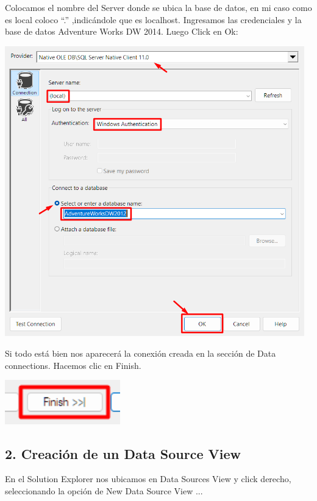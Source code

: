 \documentclass[12pt,letterpaper]{article}
\begin{document}
Colocamos el nombre del Server donde se ubica la base de datos, en mi caso como es local coloco “.” ,indicándole que es localhost. Ingresamos las credenciales y la base de datos Adventure Works DW 2014. Luego Click en Ok:

\begin{center}
    \includegraphics[width=13cm]{./img/img4.png}
\end{center}

Si todo está bien nos aparecerá la conexión creada en la sección de Data connections. Hacemos clic en Finish.

\begin{center}
    \includegraphics[width=5cm]{./img/img5.png}
\end{center}

\subsection{2. Creación de un Data Source View}

En el Solution Explorer nos ubicamos en Data Sources View y click derecho, seleccionando la opción de New Data Source View ...
\end{document}
